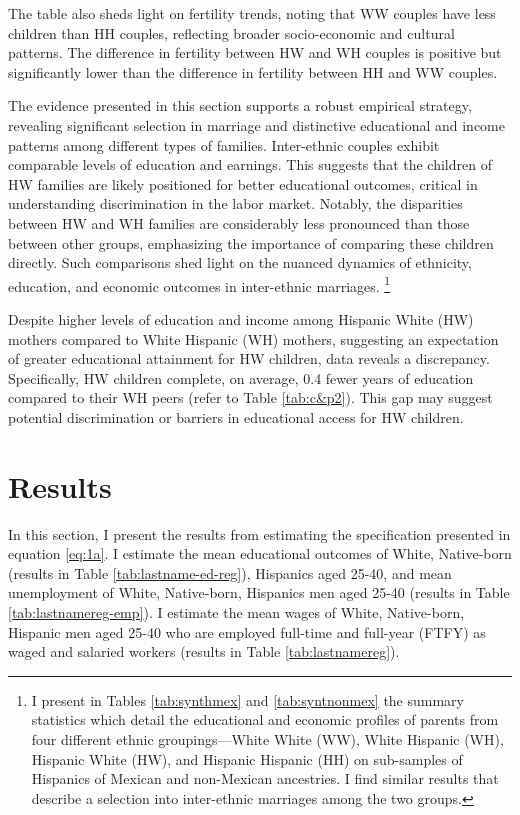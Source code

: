 The table also sheds light on fertility trends, noting that WW couples have less children than HH couples, reflecting broader socio-economic and cultural patterns. The difference in fertility between HW and WH couples is positive but significantly lower than the difference in fertility between HH and WW couples.

The evidence presented in this section supports a robust empirical strategy, revealing significant selection in marriage and distinctive educational and income patterns among different types of families. Inter-ethnic couples exhibit comparable levels of education and earnings. This suggests that the children of HW families are likely positioned for better educational outcomes, critical in understanding discrimination in the labor market. Notably, the disparities between HW and WH families are considerably less pronounced than those between other groups, emphasizing the importance of comparing these children directly. Such comparisons shed light on the nuanced dynamics of ethnicity, education, and economic outcomes in inter-ethnic marriages. \footnote{I present in Tables \ref{tab:synthmex} and \ref{tab:syntnonmex} the summary statistics which detail the educational and economic profiles of parents from four different ethnic groupings—White White (WW), White Hispanic (WH), Hispanic White (HW), and Hispanic Hispanic (HH) on sub-samples of Hispanics of Mexican and non-Mexican ancestries. I find similar results that describe a selection into inter-ethnic marriages among the two groups.} 

Despite higher levels of education and income among Hispanic White (HW) mothers compared to White Hispanic (WH) mothers, suggesting an expectation of greater educational attainment for HW children, data reveals a discrepancy. Specifically, HW children complete, on average, 0.4 fewer years of education compared to their WH peers (refer to Table \ref{tab:c&p2}). This gap may suggest potential discrimination or barriers in educational access for HW children.

\section{Results}\label{sec:results}

In this section, I present the results from estimating the specification presented in equation \ref{eq:1a}. I estimate the mean educational outcomes of White, Native-born (results in Table \ref{tab:lastname-ed-reg}), Hispanics aged 25-40, and mean unemployment of White, Native-born, Hispanics men aged 25-40 (results in Table \ref{tab:lastnamereg-emp}). I estimate the mean wages of White, Native-born, Hispanic men aged 25-40 who are employed full-time and full-year (FTFY) as waged and salaried workers (results in Table \ref{tab:lastnamereg}).

